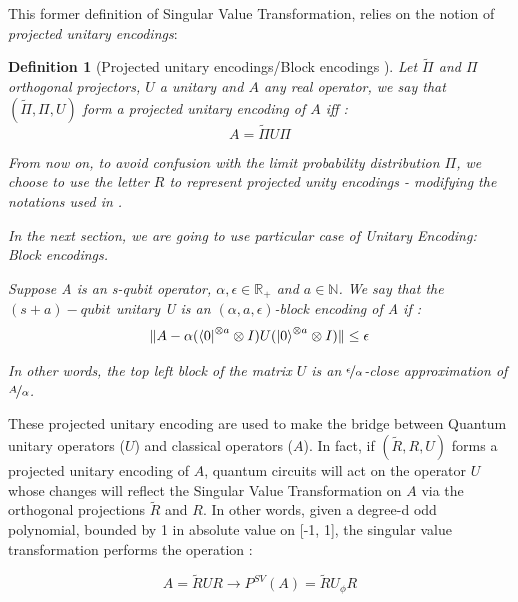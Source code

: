 \documentclass{article}
\newtheorem{definition}{Definition}[section]
\begin{document}
This former definition of Singular Value Transformation, relies on the notion of \textit{projected unitary encodings}:

\begin{definition}[Projected unitary encodings/Block encodings \cite{gilyén_su_low_wiebe_2019}]

Let $\widetilde{\Pi}$ and $\Pi$ orthogonal projectors, $U$ a unitary and $A$ any real operator, we say that $(\widetilde{\Pi}, \Pi, U)$ form a projected unitary encoding of $A$ iff : 
\begin{equation}
    A = \widetilde{\Pi} U \Pi
\end{equation}

From now on, to avoid confusion with the limit probability distribution $\Pi$, we choose to use the letter $R$ to represent projected unity encodings - modifying the notations used in \cite{gilyén_su_low_wiebe_2019}.

In the next section, we are going to use particular case of Unitary Encoding: Block encodings.

Suppose A is an s-qubit operator, $\alpha, \epsilon \in \mathbb{R}_+$ and $a \in \mathbb{N}$. We say that the $(s+a)-qubit$ unitary U is an $(\alpha, a, \epsilon)$-block encoding of A if :
\begin{equation}
    \|A - \alpha(\bra{0}^{\otimes a} \otimes I) U (\ket{0}^{\otimes a} \otimes I) \| \leq \epsilon
\end{equation}

In other words, the top left block of the matrix $U$ is an $\nicefrac{\epsilon}{\alpha}$-close approximation of $\nicefrac{A}{\alpha}$.

\end{definition}

These projected unitary encoding are used to make the bridge between Quantum unitary operators ($U$) and classical operators ($A$). In fact, if $(\widetilde{R}, R, U)$ forms a projected unitary encoding of $A$, quantum circuits will act on the operator $U$ whose changes will reflect the Singular Value Transformation on $A$ via the orthogonal projections $\widetilde{R}$ and $R$. In other words, given a degree-d odd polynomial, bounded by 1 in absolute value on [-1, 1], the singular value transformation performs the operation :

\begin{equation}
    A = \widetilde{R} U R \rightarrow P^{SV}(A) = \widetilde{R} U_{\phi} R
\end{equation}
\end{document}
